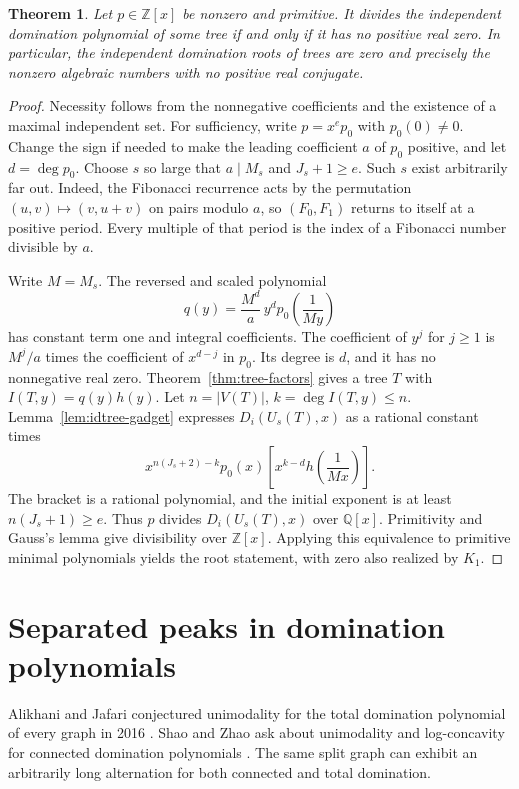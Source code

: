 \documentclass[11pt,a4paper]{article}
\newtheorem{theorem}{Theorem}[section]
\begin{document}
\begin{theorem}\label{thm:idtree-universal}
Let $p\in\mathbb Z[x]$ be nonzero and primitive. It divides the independent
domination polynomial of some tree if and only if it has no positive real
zero. In particular, the independent domination roots of trees are zero
and precisely the nonzero algebraic numbers with no positive real conjugate.
\end{theorem}
\begin{proof}
Necessity follows from the nonnegative coefficients and the existence of a
maximal independent set. For sufficiency, write $p=x^e p_0$ with $p_0(0)\ne0$.
Change the sign if needed to make the leading coefficient $a$ of $p_0$
positive, and let $d=\deg p_0$. Choose $s$ so large that $a\mid M_s$ and
$J_s+1\ge e$. Such $s$ exist arbitrarily far out. Indeed, the Fibonacci
recurrence acts by the permutation $(u,v)\mapsto(v,u+v)$ on pairs modulo
$a$, so $(F_0,F_1)$ returns to itself at a positive period. Every multiple
of that period is the index of a Fibonacci number divisible by $a$.

Write $M=M_s$. The reversed and scaled polynomial
\[
 q(y)=\frac{M^d}{a}\,y^d p_0\!\left(\frac1{My}\right)
\]
has constant term one and integral coefficients. The coefficient of $y^j$
for $j\ge1$ is $M^j/a$ times the coefficient of $x^{d-j}$ in $p_0$.
Its degree is $d$, and it has no nonnegative real zero.
Theorem~\ref{thm:tree-factors} gives a tree $T$ with $I(T,y)=q(y)h(y)$.
Let $n=|V(T)|$, $k=\deg I(T,y)\le n$. Lemma~\ref{lem:idtree-gadget}
expresses $D_i(U_s(T),x)$ as a rational constant times
\[
 x^{n(J_s+2)-k}p_0(x)
       \left[x^{k-d}h\!\left(\frac1{Mx}\right)\right].
\]
The bracket is a rational polynomial, and the initial exponent is at least
$n(J_s+1)\ge e$. Thus $p$ divides $D_i(U_s(T),x)$ over $\mathbb Q[x]$.
Primitivity and Gauss's lemma give divisibility over $\mathbb Z[x]$.
Applying this equivalence to primitive minimal polynomials yields the root
statement, with zero also realized by $K_1$.
\end{proof}

\section{Separated peaks in domination polynomials}
\label{sec:dom-peaks}

Alikhani and Jafari conjectured unimodality for the total domination polynomial of every graph in 2016 \cite[Conjecture~2.9]{alijafari}. Shao and Zhao ask about unimodality and log-concavity for connected
domination polynomials \cite[Section~5.2]{shao}. The same split graph can
exhibit an arbitrarily long alternation for both connected and total
domination.
\end{document}
